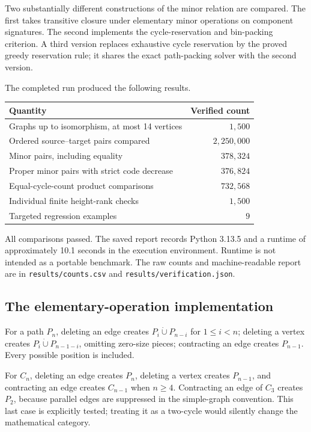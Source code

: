 \documentclass[11pt,letterpaper]{article}
\theoremstyle{plain}
\theoremstyle{definition}
\theoremstyle{remark}
\newcommand{\sqgraph}{\mathbin{\dot\cup}}
\begin{document}
Two substantially different constructions of the minor relation are
compared. The first takes transitive closure under elementary minor
operations on component signatures. The second implements the
cycle-reservation and bin-packing criterion. A third version replaces
exhaustive cycle reservation by the proved greedy reservation rule;
it shares the exact path-packing solver with the second version.

The completed run produced the following results.
\begin{center}
\renewcommand{\arraystretch}{1.2}
\begin{tabular}{@{}lr@{}}
\toprule
Quantity & Verified count\\
\midrule
Graphs up to isomorphism, at most 14 vertices & $1{,}500$\\
Ordered source--target pairs compared & $2{,}250{,}000$\\
Minor pairs, including equality & $378{,}324$\\
Proper minor pairs with strict code decrease & $376{,}824$\\
Equal-cycle-count product comparisons & $732{,}568$\\
Individual finite height-rank checks & $1{,}500$\\
Targeted regression examples & $9$\\
\bottomrule
\end{tabular}
\end{center}

All comparisons passed. The saved report records Python 3.13.5 and a
runtime of approximately 10.1 seconds in the execution environment.
Runtime is not intended as a portable benchmark. The raw counts and
machine-readable report are in \texttt{results/counts.csv} and
\texttt{results/verification.json}.

\subsection{The elementary-operation implementation}

For a path $P_n$, deleting an edge creates
$P_i\sqgraph P_{n-i}$ for $1\le i<n$; deleting a vertex creates
$P_i\sqgraph P_{n-1-i}$, omitting zero-size pieces; contracting an
edge creates $P_{n-1}$. Every possible position is included.

For $C_n$, deleting an edge creates $P_n$, deleting a vertex creates
$P_{n-1}$, and contracting an edge creates $C_{n-1}$ when $n\ge4$.
Contracting an edge of $C_3$ creates $P_2$, because parallel edges
are suppressed in the simple-graph convention. This last case is
explicitly tested; treating it as a two-cycle would silently change
the mathematical category.
\end{document}
